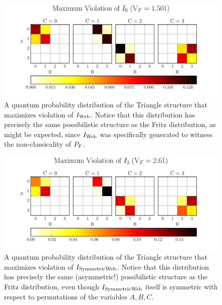 \documentclass[aps, 10pt, english, twoside, pra, nofootinbib, tightenlines, longbibliography, superscriptaddress]{revtex4-1}
\begin{document}
    \begin{figure}
    \begin{nscenter}
        \includegraphics[scale=0.6,trim={0 0 0 0.4in},clip]{figure_plotted_dist_I_1_max_violation.pdf}
        \caption{A quantum probability distribution of the Triangle structure that maximizes violation of $I_\text{Web}$. Notice that this distribution has precisely the same possibilistic structure as the Fritz distribution, as might be expected, since $I_\text{Web}$ was specifically generated to witness the non-classicality of $\prob[\fritz]$.}
        \label{fig:maximum_violation_I_1}
    \end{nscenter}
    \end{figure}
    \begin{figure}
    \begin{nscenter}
        \includegraphics[scale=0.6,trim={0 0 0 0.4in},clip]{figure_plotted_dist_I_3_max_violation.pdf}
        \caption{A quantum probability distribution of the Triangle structure that maximizes violation of $I_\text{SymmetricWeb}$. Notice that this distribution has precisely the same (asymmetric!) possibilistic structure as the Fritz distribution, even though $I_\text{SymmetricWeb}$ itself is symmetric with respect to permutations of the variables $A, B, C$. }
        \label{fig:maximum_violation_I_3}
    \end{nscenter}
    \end{figure}
\end{document}
